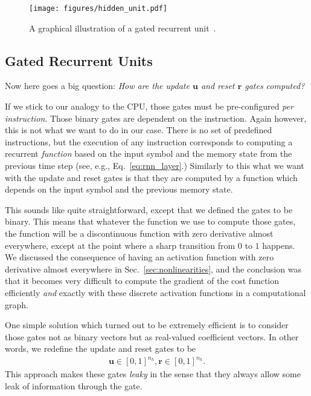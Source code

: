 \documentclass{report}
\newcommand{\vect}[1]{\mathbf{#1}}
\newcommand{\vu}[0]{\vect{u}}
\newcommand{\vr}[0]{\vect{r}}
\begin{document}
\begin{figure}[ht]
    \centering
    \begin{minipage}{0.50\textwidth}
        \centering
        \texttt{[image: figures/hidden\_unit.pdf]}
    \end{minipage}
    \hfill
    \begin{minipage}{0.47\textwidth}
        \caption{
            A graphical illustration of a gated recurrent
            unit~\cite{Cho-et-al-EMNLP2014}.
        }
        \label{fig:gru}
    \end{minipage}
\end{figure}

\subsection{Gated Recurrent Units}
\label{sec:gru}

Now here goes a big question: {\em How are the update $\vu$ and reset $\vr$
gates computed?}

If we stick to our analogy to the CPU, those gates must be pre-configured {\em
per instruction}. Those binary gates are dependent on the instruction. Again
however, this is not what we want to do in our case. There is no set of
predefined instructions, but the execution of any instruction corresponds to
computing a recurrent {\em function} based on the input symbol and the memory
state from the previous time step (see, e.g., Eq.~\eqref{eq:rnn_layer}.)
Similarly to this what we want with the update and reset gates is that they are
computed by a function which depends on the input symbol and the previous memory
state.

This sounds like quite straightforward, except that we defined the gates to be
binary. This means that whatever the function we use to compute those gates, the
function will be a discontinuous function with zero derivative almost
everywhere, except at the point where a sharp transition from $0$ to $1$
happens. We discussed the consequence of having an activation function with zero
derivative almost everywhere in Sec.~\ref{sec:nonlinearities}, and the
conclusion was that it becomes very difficult to compute the gradient of the
cost function efficiently {\em and} exactly with these discrete activation
functions in a computational graph.

One simple solution which turned out to be extremely efficient is to consider
those gates not as binary vectors but as real-valued coefficient vectors. In
other words, we redefine the update and reset gates to be
\begin{align*}
    \vu \in \left[ 0, 1 \right]^{n_h}, \vr \in \left[ 0, 1\right]^{n_h}.
\end{align*}
This approach makes these gates {\em leaky} in the sense that they always allow
some leak of information through the gate.
\end{document}
